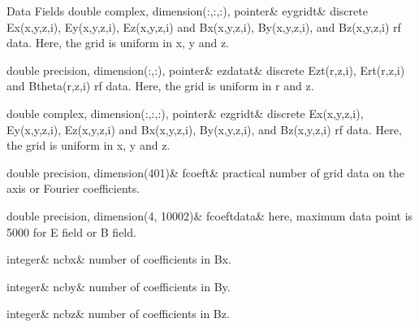 \begin{DoxyFields}{Data Fields}
\mbox{\label{namespacedataclass_a639f6d59caf105d71786b5af143f5e00}} 
double complex, dimension(:,:,:), pointer&
eygridt&
discrete Ex(x,y,z,i), Ey(x,y,z,i), Ez(x,y,z,i) and Bx(x,y,z,i), By(x,y,z,i), and Bz(x,y,z,i) rf data. Here, the grid is uniform in x, y and z. \\
\hline

\mbox{\label{namespacedataclass_a117a66a64c471555f76b60475a5eb749}} 
double precision, dimension(:,:), pointer&
ezdatat&
discrete Ezt(r,z,i), Ert(r,z,i) and Btheta(r,z,i) rf data. Here, the grid is uniform in r and z. \\
\hline

\mbox{\label{namespacedataclass_a2df20efd300756cc323b7e2cd58ca1b3}} 
double complex, dimension(:,:,:), pointer&
ezgridt&
discrete Ex(x,y,z,i), Ey(x,y,z,i), Ez(x,y,z,i) and Bx(x,y,z,i), By(x,y,z,i), and Bz(x,y,z,i) rf data. Here, the grid is uniform in x, y and z. \\
\hline

\mbox{\label{namespacedataclass_a5225985a5539f3faa0647566e1422248}} 
double precision, dimension(401)&
fcoeft&
practical number of grid data on the axis or Fourier coefficients. \\
\hline

\mbox{\label{namespacedataclass_a79c88db5f53e7b262d5235a48d82e48a}} 
double precision, dimension(4, 10002)&
fcoeftdata&
here, maximum data point is 5000 for E field or B field. \\
\hline

\mbox{\label{namespacedataclass_a37ffb6adb65210dfd042477d255254e2}} 
integer&
ncbx&
number of coefficients in Bx. \\
\hline

\mbox{\label{namespacedataclass_ac1e45e629c42014acf508271aedce0e0}} 
integer&
ncby&
number of coefficients in By. \\
\hline

\mbox{\label{namespacedataclass_a54e28e2886fb385cf7e33132b1085d5d}} 
integer&
ncbz&
number of coefficients in Bz. \\
\hline


\end{DoxyFields}
